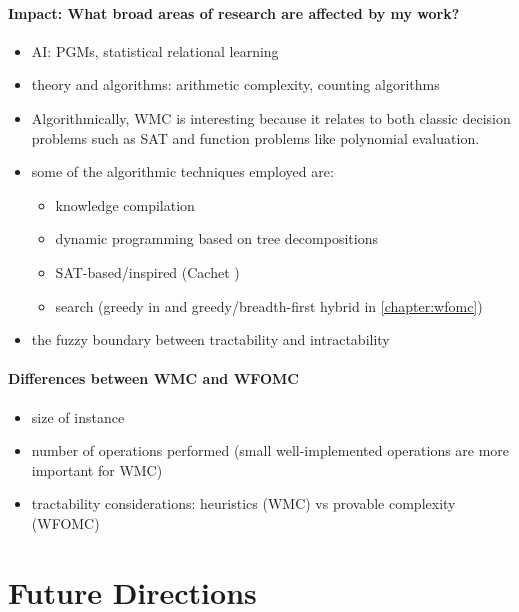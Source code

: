 \paragraph{Impact: What broad areas of research are affected by my work?}
\begin{itemize}
\item AI: PGMs, statistical relational learning
\item theory and algorithms: arithmetic complexity, counting algorithms
\end{itemize}


\begin{itemize}
\item Algorithmically, WMC is interesting because it relates to both classic decision problems such as SAT and function problems like polynomial evaluation.
\item some of the algorithmic techniques employed are:
  \begin{itemize}
  \item knowledge compilation \citep{DBLP:journals/jair/DarwicheM02}
  \item dynamic programming based on tree decompositions \citep{DBLP:conf/cp/DudekPV20}
  \item SAT-based/inspired (Cachet \citep{DBLP:conf/sat/SangBBKP04})
  \item search (greedy in \citep{DBLP:conf/ijcai/BroeckTMDR11} and greedy/breadth-first hybrid in \cref{chapter:wfomc})
  \end{itemize}
\item the fuzzy boundary between tractability and intractability
\end{itemize}

\paragraph{Differences between WMC and WFOMC}
\begin{itemize}
\item size of instance
\item number of operations performed (small well-implemented operations are more important for WMC)
\item tractability considerations: heuristics (WMC) vs provable complexity (WFOMC)
\end{itemize}

\section{Future Directions}

